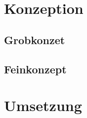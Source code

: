 \begin{onehalfspace}
\section{Konzeption}
\label{subsection:konzeption}

\subsection{Grobkonzet}
\label{subsubsec:grobkonzept}

\subsection{Feinkonzept}
\label{subsubsec:feinkonzept}

\section{Umsetzung}
\label{umsetzung}

\newpage
\end{onehalfspace}
